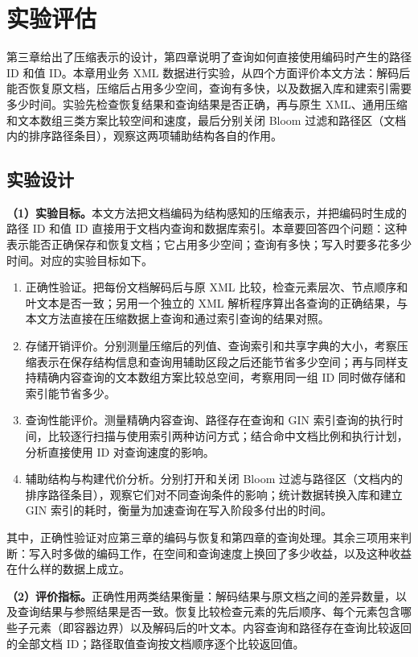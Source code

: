\chapter{实验评估}
\label{chap:evaluation}

第三章给出了压缩表示的设计，第四章说明了查询如何直接使用编码时产生的路径 ID 和值 ID。本章用业务 XML 数据进行实验，从四个方面评价本文方法：解码后能否恢复原文档，压缩后占用多少空间，查询有多快，以及数据入库和建索引需要多少时间。实验先检查恢复结果和查询结果是否正确，再与原生 XML、通用压缩和文本数组三类方案比较空间和速度，最后分别关闭 Bloom 过滤和路径区（文档内的排序路径条目），观察这两项辅助结构各自的作用。

\section{实验设计}
\textbf{（1）实验目标。}本文方法把文档编码为结构感知的压缩表示，并把编码时生成的路径 ID 和值 ID 直接用于文档内查询和数据库索引。本章要回答四个问题：这种表示能否正确保存和恢复文档；它占用多少空间；查询有多快；写入时要多花多少时间。对应的实验目标如下。
\begin{enumerate}[label={（\arabic*）},leftmargin=2.5em,itemsep=0.4em]
  \item 正确性验证。把每份文档解码后与原 XML 比较，检查元素层次、节点顺序和叶文本是否一致；另用一个独立的 XML 解析程序算出各查询的正确结果，与本文方法直接在压缩数据上查询和通过索引查询的结果对照。
  \item 存储开销评价。分别测量压缩后的列值、查询索引和共享字典的大小，考察压缩表示在保存结构信息和查询用辅助区段之后还能节省多少空间；再与同样支持精确内容查询的文本数组方案比较总空间，考察用同一组 ID 同时做存储和索引能节省多少。
  \item 查询性能评价。测量精确内容查询、路径存在查询和 GIN 索引查询的执行时间，比较逐行扫描与使用索引两种访问方式；结合命中文档比例和执行计划，分析直接使用 ID 对查询速度的影响。
  \item 辅助结构与构建代价分析。分别打开和关闭 Bloom 过滤与路径区（文档内的排序路径条目），观察它们对不同查询条件的影响；统计数据转换入库和建立 GIN 索引的耗时，衡量为加速查询在写入阶段多付出的时间。
\end{enumerate}

其中，正确性验证对应第三章的编码与恢复和第四章的查询处理。其余三项用来判断：写入时多做的编码工作，在空间和查询速度上换回了多少收益，以及这种收益在什么样的数据上成立。

\textbf{（2）评价指标。}正确性用两类结果衡量：解码结果与原文档之间的差异数量，以及查询结果与参照结果是否一致。恢复比较检查元素的先后顺序、每个元素包含哪些子元素（即容器边界）以及解码后的叶文本。内容查询和路径存在查询比较返回的全部文档 ID；路径取值查询按文档顺序逐个比较返回值。

